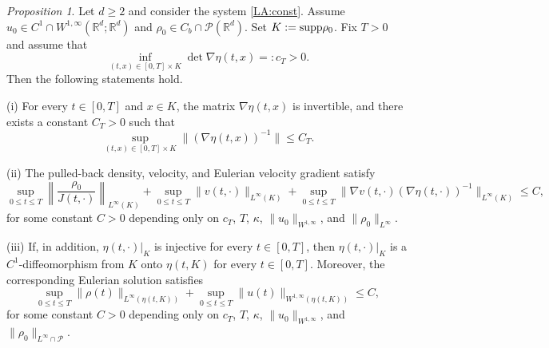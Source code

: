 \documentclass[11pt]{amsart}
\numberwithin{equation}{section}
\newtheorem{proposition}[theorem]{Proposition}
\theoremstyle{definition}
\theoremstyle{remark}
\numberwithin{equation}{section}
\newtheorem{proposition}[theorem]{Proposition}
\newcommand{\R}{\mathbb R}
\newcommand{\bq}{\begin{equation}}
\newcommand{\eq}{\end{equation}}
\newcommand{\calP}{\mathcal P}
\newcommand{\supp}{{\rm supp}}
\renewcommand{\ge}{\geqslant}
\renewcommand{\le}{\leqslant}
\begin{document}
\begin{proposition} \label{prop:subcri_const_d}
Let $d\ge2$ and consider the system \eqref{LA:const}.
Assume $u_0\in C^1\cap W^{1,\infty}(\R^d;\R^d)$ and $\rho_0\in C_b\cap\calP(\R^d)$.
Set $K:=\supp\rho_0$. Fix $T>0$ and assume that  
\bq\label{eq:det_lower_d}
\inf_{(t,x)\in[0,T]\times K}\det\nabla\eta(t,x)=:c_T >0.
\eq
Then the following statements hold.


\smallskip\noindent
\rm (i) For every $t\in[0,T]$ and $x\in K$, the matrix $\nabla\eta(t,x)$ is invertible, and there exists a constant $C_T>0$ such that
\[
\sup_{(t,x)\in[0,T]\times K}\|(\nabla\eta(t,x))^{-1}\|\le C_T.
\]

\noindent
\rm (ii) The pulled-back density, velocity, and Eulerian velocity gradient satisfy
\[
\sup_{0\le t\le T} \left\|\frac{\rho_0}{J(t,\cdot)}\right\|_{L^\infty(K)} + \sup_{0\le t\le T} \|v(t,\cdot)\|_{L^\infty(K)} + \sup_{0\le t\le T} \|\nabla v(t,\cdot)(\nabla\eta(t,\cdot))^{-1}\|_{L^\infty(K)} \le C,
\]
for some constant $C>0$ depending only on $c_T$, $T$, $\kappa$, $\|u_0\|_{W^{1,\infty}}$, and $\|\rho_0\|_{L^\infty}$.


\smallskip\noindent
\rm (iii) If, in addition, $\eta(t,\cdot)|_K$ is injective for every $t\in[0,T]$, then $\eta(t,\cdot)|_K$ is a $C^1$-diffeomorphism from $K$ onto $\eta(t,K)$ for every $t\in[0,T]$.  Moreover, the corresponding Eulerian solution satisfies
\[
\sup_{0\le t\le T}\|\rho(t)\|_{L^\infty(\eta(t,K))}+\sup_{0\le t\le T}\|u(t)\|_{W^{1,\infty}(\eta(t,K))}\le C,
\]
for some constant $C>0$ depending only on $c_T$, $T$, $\kappa$, $\|u_0\|_{W^{1,\infty}}$, and $\|\rho_0\|_{L^\infty\cap\calP}$.
\end{proposition}
\end{document}

